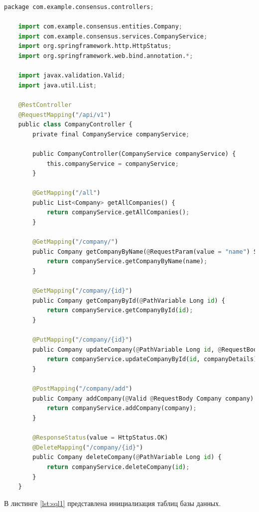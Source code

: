 \begin{lstlisting}[label=lst:control2, caption=Пример реализации взаимодействия клиента с сервером, language=python]
	package com.example.consensus.controllers;

	import com.example.consensus.entities.Company;
	import com.example.consensus.services.CompanyService;
	import org.springframework.http.HttpStatus;
	import org.springframework.web.bind.annotation.*;
	
	import javax.validation.Valid;
	import java.util.List;
	
	@RestController
	@RequestMapping("/api/v1")
	public class CompanyController {
		private final CompanyService companyService;
	
		public CompanyController(CompanyService companyService) {
			this.companyService = companyService;
		}
	
		@GetMapping("/all")
		public List<Company> getAllCompanies() {
			return companyService.getAllCompanies();
		}
	
		@GetMapping("/company/")
		public Company getCompanyByName(@RequestParam(value = "name") String name) {
			return companyService.getCompanyByName(name);
		}
	
		@GetMapping("/company/{id}")
		public Company getCompanyById(@PathVariable Long id) {
			return companyService.getCompanyById(id);
		}
	
		@PutMapping("/company/{id}")
		public Company updateCompany(@PathVariable Long id, @RequestBody Company companyDetails) {
			return companyService.updateCompanyById(id, companyDetails);
		}
	
		@PostMapping("/company/add")
		public Company addCompany(@Valid @RequestBody Company company) {
			return companyService.addCompany(company);
		}
	
		@ResponseStatus(value = HttpStatus.OK)
		@DeleteMapping("/company/{id}")
		public Company deleteCompany(@PathVariable Long id) {
			return companyService.deleteCompany(id);
		}
	}	
\end{lstlisting}

В листинге \ref{lst:sql1} представлена инициализация таблиц базы данных.


